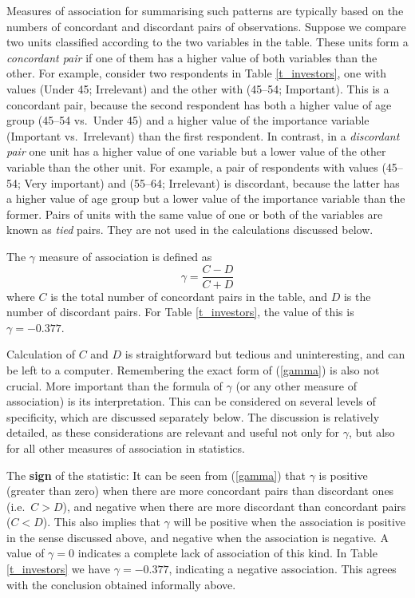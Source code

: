 Measures of association for summarising such patterns are typically
based on the numbers of concordant and discordant pairs of observations.
Suppose we compare two units classified according to the two variables
in the table. These units form a \emph{concordant pair} if one of them
has a higher value of both variables than the other. For example,
consider two respondents in Table \ref{t_investors}, one with values
(Under 45; Irrelevant) and the other with (45--54; Important). This is a
concordant pair, because the second respondent has both a higher value
of age group (45--54 vs.\ Under 45) and a higher value of the importance
variable (Important vs.\ Irrelevant) than the first respondent. In
contrast, in a \emph{discordant pair} one unit has a higher value of one
variable but a lower value of the other variable than the other unit.
For example, a pair of
respondents with values (45--54; Very important) and (55--64;
Irrelevant) is discordant, because the latter has a higher value of age
group but a lower value of the importance variable than the former.
Pairs of units with the same value of one or both of the variables are
known as \emph{tied} pairs. They are not used in the calculations
discussed below.

The $\gamma$ measure of association is defined as
\begin{equation}
\gamma=\frac{C-D}{C+D}
\label{gamma}
\end{equation}
where $C$ is the total number of concordant pairs in the table, and $D$
is the number of discordant pairs. For Table \ref{t_investors},
the value of this is $\gamma=-0.377$.

Calculation of $C$ and $D$ is straightforward but
tedious and uninteresting, and can be left to a computer. Remembering
the exact form of (\ref{gamma}) is also not crucial. More important than
the formula of $\gamma$ (or any other measure of association) is its
interpretation. This can be considered on several levels of specificity,
which are discussed separately below. The discussion is relatively
detailed, as these considerations are relevant and useful not only
for $\gamma$, but also for all other measures of association in statistics.

The \textbf{sign} of the statistic: It can be seen from (\ref{gamma})
that $\gamma$ is positive (greater than zero) when there are more
concordant pairs than discordant ones (i.e.\ $C>D$), and negative
when there are more discordant than concordant pairs ($C<D$).
This also implies that $\gamma$ will be positive when the association
is positive in the sense discussed above, and negative when
the association is negative. A value of $\gamma=0$ indicates a complete
lack of association of this kind. In Table \ref{t_investors} we have
$\gamma=-0.377$, indicating a negative association. This agrees with the
conclusion obtained informally above.

